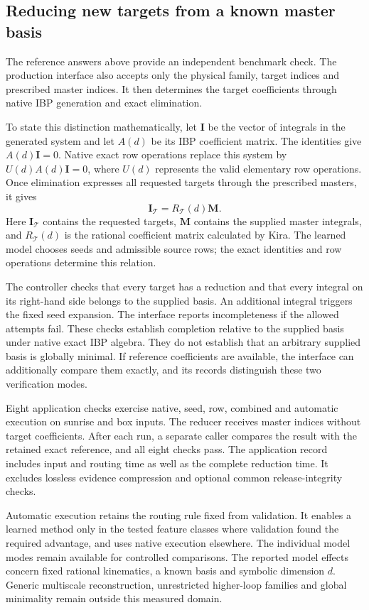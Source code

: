 \clearpage
\subsection{Reducing new targets from a known master basis}
The reference answers above provide an independent benchmark check.
The production interface also accepts only the physical family, target
indices and prescribed master indices. It then determines the target
coefficients through native IBP generation and exact elimination.

To state this distinction mathematically, let $\boldsymbol I$ be the vector
of integrals in the generated system and let $A(d)$ be its IBP coefficient
matrix. The identities give $A(d)\boldsymbol I=0$. Native exact row operations
replace this system by $U(d)A(d)\boldsymbol I=0$, where $U(d)$ represents the
valid elementary row operations. Once elimination expresses all requested
targets through the prescribed masters, it gives
\[
 \boldsymbol I_{\mathcal T}=R_{\mathcal T}(d)\boldsymbol M.
\]
Here $\boldsymbol I_{\mathcal T}$ contains the requested targets,
$\boldsymbol M$ contains the supplied master integrals, and
$R_{\mathcal T}(d)$ is the rational coefficient matrix calculated by Kira.
The learned model chooses seeds and admissible source rows; the exact
identities and row operations determine this relation.

The controller checks that every target has a reduction and that every
integral on its right-hand side belongs to the supplied basis.
An additional integral triggers the fixed seed expansion. The interface
reports incompleteness if the allowed attempts fail. These checks establish
completion relative to the supplied basis under native exact IBP algebra.
They do not establish that an arbitrary supplied basis is globally minimal.
If reference coefficients are available, the interface can additionally
compare them exactly, and its records distinguish these two verification modes.

Eight application checks exercise native, seed, row, combined and automatic
execution on sunrise and box inputs. The reducer receives master indices
without target coefficients. After each run, a separate caller compares the
result with the retained exact reference, and all eight checks pass.
The application record includes input and routing time as well as the complete
reduction time. It excludes lossless evidence compression and optional common
release-integrity checks.

Automatic execution retains the routing rule fixed from validation. It enables
a learned method only in the tested feature classes where validation found
the required advantage, and uses native execution elsewhere. The individual
model modes remain available for controlled comparisons. The reported
model effects concern fixed rational kinematics, a known basis and symbolic
dimension $d$. Generic multiscale reconstruction, unrestricted higher-loop
families and global minimality remain outside this measured domain.
